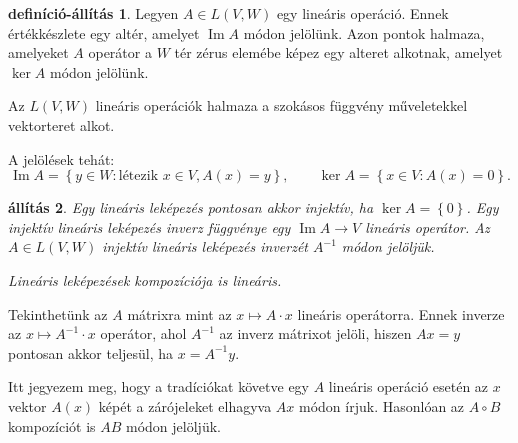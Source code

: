 \documentclass[9pt, showtrims]{memoir}
\theoremstyle{plain}
\newtheorem{proposition}{állítás}[section]
\theoremstyle{remark}
\theoremstyle{definition}
\newtheorem{defprop}[proposition]{definíció-állítás}
\DeclareMathOperator{\im}{Im}
\begin{document}
\begin{defprop}
    Legyen $A\in L\left( V,W \right)$ egy lineáris operáció.
    Ennek értékkészlete egy altér, 
    amelyet $\im A$ módon jelölünk.
    Azon pontok halmaza, 
    amelyeket $A$ operátor a $W$ tér zérus elemébe képez egy alteret alkotnak,
    amelyet $\ker A$ módon jelölünk.

    Az $L\left( V,W \right)$ lineáris operációk halmaza a szokásos függvény műveletekkel vektorteret alkot.
\end{defprop}
A jelölések tehát:
\[
    \im A=\left\{ y\in W:\text{létezik } x\in V, A(x)=y \right\},
    \qquad
    \ker A=
    \left\{ x\in V:A\left( x \right)=0 \right\}.
\]
\begin{proposition}
    Egy lineáris leképezés pontosan akkor injektív, ha $\ker A=\left\{ 0 \right\}$.
    Egy injektív lineáris leképezés inverz függvénye egy $\im A\to V$ lineáris operátor.
    Az $A\in L\left( V,W \right)$ injektív lineáris leképezés inverzét $A^{-1}$ módon jelöljük.

    Lineáris leképezések kompozíciója is lineáris.
\end{proposition}
Tekinthetünk az $A$ mátrixra mint az $x\mapsto A\cdot x$ lineáris operátorra.
Ennek inverze az $x\mapsto A^{-1}\cdot x$ operátor,
ahol $A^{-1}$ az inverz mátrixot jelöli, hiszen
$Ax=y$ pontosan akkor teljesül, ha $x=A^{-1}y$.

Itt jegyezem meg, hogy a tradíciókat követve egy $A$ lineáris operáció esetén az $x$ vektor
$A\left( x \right)$ képét a zárójeleket elhagyva $Ax$ módon írjuk.
Hasonlóan az $A\circ B$ kompozíciót is $AB$ módon jelöljük.
\end{document}
